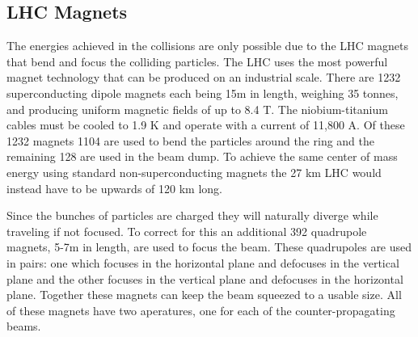 \subsection{LHC Magnets}
The energies achieved in the collisions are only possible due to the LHC magnets that bend and focus the colliding particles.  The LHC uses the most powerful magnet technology that can be produced on an industrial scale.  There are 1232 superconducting dipole magnets each being 15m in length, weighing 35 tonnes, and producing uniform magnetic fields of up to 8.4 T.  The niobium-titanium cables must be cooled to 1.9 K and operate with a current of 11,800 A.  Of these 1232 magnets 1104 are used to bend the particles around the ring and the remaining 128 are used in the beam dump.  To achieve the same center of mass energy using standard non-superconducting magnets the 27 km LHC would instead have to be upwards of 120 km long.

Since the bunches of particles are charged they will naturally diverge while traveling if not focused.  To correct for this an additional 392 quadrupole magnets, 5-7m in length, are used to focus the beam.  These quadrupoles are used in pairs: one which focuses in the horizontal plane and defocuses in the vertical plane and the other focuses in the vertical plane and defocuses in the horizontal plane.  Together these magnets can keep the beam squeezed to a usable size.  All of these magnets have two aperatures, one for each of the counter-propagating beams.

